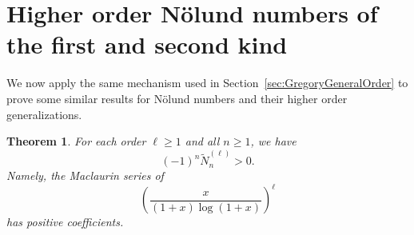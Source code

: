 \documentclass[11pt]{article}
\theoremstyle{plain}
\newtheorem{thm}{Theorem}[section]
\theoremstyle{definition}
\begin{document}
\section{Higher order N\"olund numbers of the first and second kind}\label{sec:Norlund1}

We now apply the same mechanism used in Section~\ref{sec:GregoryGeneralOrder} to prove some similar results for N\"olund numbers and their higher order generalizations.

\begin{thm}\label{thm:Norlund1}
For each order $\ell\ge 1$ and all $n\ge 1$, we have
\begin{equation*}
(-1)^{n} {\tilde N}_n^{(\ell)}>0.
\end{equation*}
Namely, the Maclaurin series of
\begin{equation*}
\left(\frac{x}{(1+x)\log(1+x)}\right)^\ell
\end{equation*}
has positive coefficients.
\end{thm}
\end{document}
